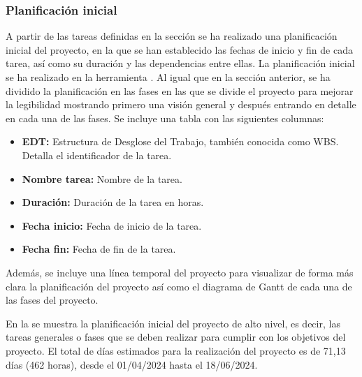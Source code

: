 \subsubsection{Planificación inicial} \label{sec:5-Planificacion-inicial}
\hypertarget{sec:5-Planificacion-inicial}{}
A partir de las tareas definidas en la sección  se ha realizado una planificación inicial del proyecto, en la que se han establecido las fechas de inicio y fin de cada tarea, así como su duración y las dependencias entre ellas. 
La planificación inicial se ha realizado en la herramienta .
Al igual que en la sección anterior, se ha dividido la planificación en las fases en las que se divide el proyecto para mejorar la legibilidad mostrando primero una visión general y después entrando en detalle en cada una de las fases.
Se incluye una tabla con las siguientes columnas:
\begin{itemize}
    \item \textbf{EDT:} Estructura de Desglose del Trabajo, también conocida como WBS. Detalla el identificador de la tarea.
    \item \textbf{Nombre tarea:} Nombre de la tarea.
    \item \textbf{Duración:} Duración de la tarea en horas.
    \item \textbf{Fecha inicio:} Fecha de inicio de la tarea.
    \item \textbf{Fecha fin:} Fecha de fin de la tarea.
\end{itemize}

Además, se incluye una línea temporal del proyecto para visualizar de forma más clara la planificación del proyecto así como el diagrama de Gantt de cada una de las fases del proyecto.

En la  se muestra la planificación inicial del proyecto de alto nivel, es decir, las tareas generales o fases que se deben realizar para cumplir con los objetivos del proyecto.
El total de días estimados para la realización del proyecto es de 71,13 días (462 horas), desde el 01/04/2024 hasta el 18/06/2024.


